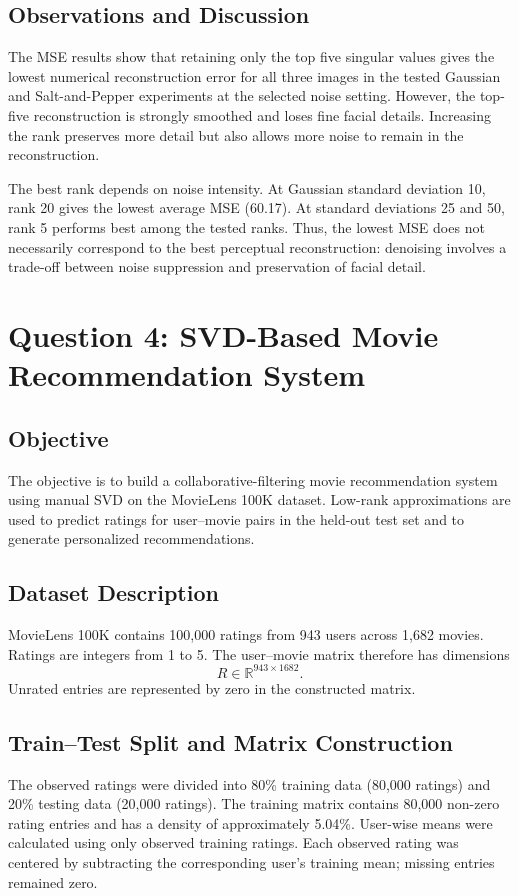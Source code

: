 \documentclass[12pt,a4paper]{report}
\begin{document}
\section{Observations and Discussion}
The MSE results show that retaining only the top five singular values gives the lowest numerical reconstruction error for all three images in the tested Gaussian and Salt-and-Pepper experiments at the selected noise setting. However, the top-five reconstruction is strongly smoothed and loses fine facial details. Increasing the rank preserves more detail but also allows more noise to remain in the reconstruction.

The best rank depends on noise intensity. At Gaussian standard deviation 10, rank 20 gives the lowest average MSE (60.17). At standard deviations 25 and 50, rank 5 performs best among the tested ranks. Thus, the lowest MSE does not necessarily correspond to the best perceptual reconstruction: denoising involves a trade-off between noise suppression and preservation of facial detail.

\chapter{Question 4: SVD-Based Movie Recommendation System}

\section{Objective}
The objective is to build a collaborative-filtering movie recommendation system using manual SVD on the MovieLens 100K dataset. Low-rank approximations are used to predict ratings for user--movie pairs in the held-out test set and to generate personalized recommendations.

\section{Dataset Description}
MovieLens 100K contains 100,000 ratings from 943 users across 1,682 movies. Ratings are integers from 1 to 5. The user--movie matrix therefore has dimensions
\[
R\in\mathbb{R}^{943\times1682}.
\]
Unrated entries are represented by zero in the constructed matrix.

\section{Train--Test Split and Matrix Construction}
The observed ratings were divided into 80\% training data (80,000 ratings) and 20\% testing data (20,000 ratings). The training matrix contains 80,000 non-zero rating entries and has a density of approximately 5.04\%. User-wise means were calculated using only observed training ratings. Each observed rating was centered by subtracting the corresponding user's training mean; missing entries remained zero.
\end{document}
